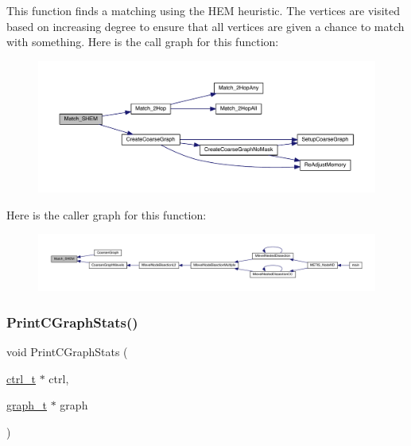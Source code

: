 This function finds a matching using the H\+EM heuristic. The vertices are visited based on increasing degree to ensure that all vertices are given a chance to match with something. Here is the call graph for this function\+:\nopagebreak
\begin{figure}[H]
\begin{center}
\leavevmode
\includegraphics[width=350pt]{a00182_af3ec72f3170ccdca06d8ad018d86cc58_cgraph}
\end{center}
\end{figure}
Here is the caller graph for this function\+:\nopagebreak
\begin{figure}[H]
\begin{center}
\leavevmode
\includegraphics[width=350pt]{a00182_af3ec72f3170ccdca06d8ad018d86cc58_icgraph}
\end{center}
\end{figure}
\mbox{\label{a00182_aac3e480e7e3bd02bfdf001d858a93562}} 
\subsubsection{\texorpdfstring{Print\+C\+Graph\+Stats()}{PrintCGraphStats()}}
{\footnotesize\ttfamily void Print\+C\+Graph\+Stats (\begin{DoxyParamCaption}\item[{\hyperlink{a00742}{ctrl\+\_\+t} $\ast$}]{ctrl,  }\item[{\hyperlink{a00734}{graph\+\_\+t} $\ast$}]{graph }\end{DoxyParamCaption})}

